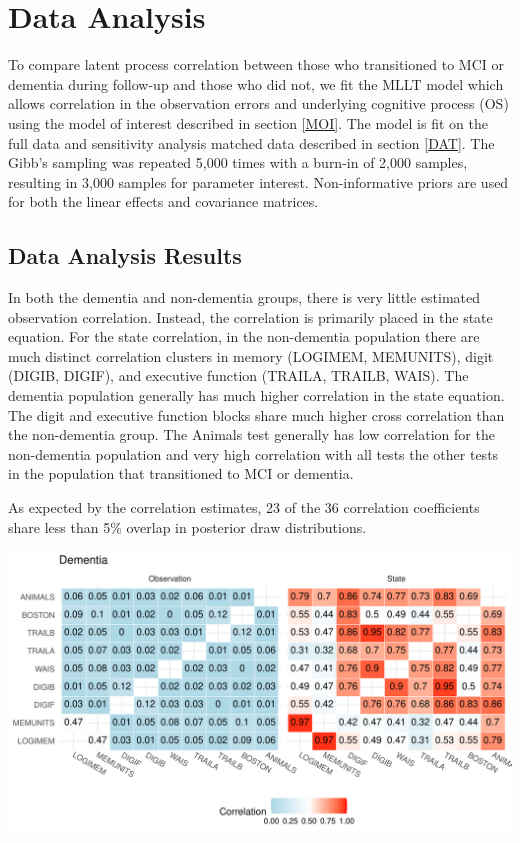\documentclass[
]{article}
\author{}
\date{\vspace{-2.5em}}
\begin{document}
\hypertarget{data-analysis}{%
\section{Data Analysis}\label{data-analysis}}

To compare latent process correlation between those who transitioned to MCI or dementia during follow-up and those who did not, we fit the MLLT model which allows correlation in the observation errors and underlying cognitive process (OS) using the model of interest described in section \ref{MOI}. The model is fit on the full data and sensitivity analysis matched data described in section \ref{DAT}. The Gibb's sampling was repeated 5,000 times with a burn-in of 2,000 samples, resulting in 3,000 samples for parameter interest. Non-informative priors are used for both the linear effects and covariance matrices.

\hypertarget{data-analysis-results}{%
\subsection{Data Analysis Results}\label{data-analysis-results}}

In both the dementia and non-dementia groups, there is very little estimated observation correlation. Instead, the correlation is primarily placed in the state equation. For the state correlation, in the non-dementia population there are much distinct correlation clusters in memory (LOGIMEM, MEMUNITS), digit (DIGIB, DIGIF), and executive function (TRAILA, TRAILB, WAIS). The dementia population generally has much higher correlation in the state equation. The digit and executive function blocks share much higher cross correlation than the non-dementia group. The Animals test generally has low correlation for the non-dementia population and very high correlation with all tests the other tests in the population that transitioned to MCI or dementia.

As expected by the correlation estimates, 23 of the 36 correlation coefficients share less than 5\% overlap in posterior draw distributions.

\includegraphics{DataAnalysis_files/figure-latex/unnamed-chunk-3-1.pdf}
\end{document}
